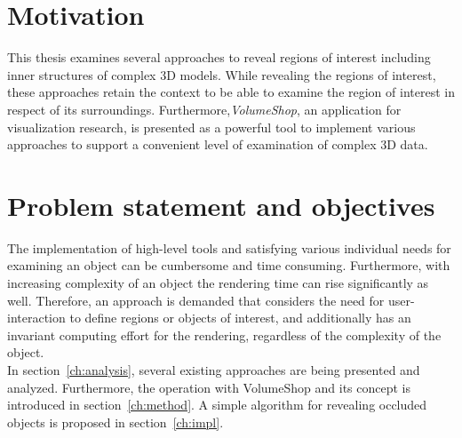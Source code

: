 \section{Motivation}
This thesis examines several approaches to reveal regions of interest including inner structures of complex 3D models. While revealing the regions of interest, these approaches retain the context to be able to examine the region of interest in respect of its surroundings. Furthermore,\emph{VolumeShop}, an application for visualization research, is presented as a powerful tool to implement various approaches to support a convenient level of examination of complex 3D data.

\section{Problem statement and objectives}
The implementation of high-level tools and satisfying various individual needs for examining an object can be cumbersome and time consuming. Furthermore, with increasing complexity of an object the rendering time can rise significantly as well. Therefore, an approach is demanded that considers the need for user-interaction to define regions or objects of interest, and additionally has an invariant computing effort for the rendering, regardless of the complexity of the object.\\
\newline
In section~\ref{ch:analysis}, several existing approaches are being presented and analyzed. Furthermore, the operation with VolumeShop and its concept is introduced in section~\ref{ch:method}. A simple algorithm for revealing occluded objects is proposed in section~\ref{ch:impl}.
